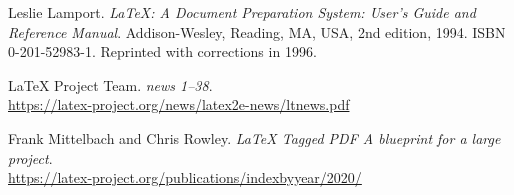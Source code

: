 \documentclass{ltnews}
\providecommand\Dash {\unskip \textemdash}
\begin{document}
\begin{thebibliography}{9}



Leslie Lamport.
\newblock \emph{{\LaTeX}: {A} Document Preparation System: User's Guide and Reference
  Manual}.
\newblock \mbox{Addison}-Wesley, Reading, MA, USA, 2nd edition, 1994.
\newblock ISBN 0-201-52983-1.
\newblock Reprinted with corrections in 1996.


 \LaTeX{} Project Team.
  \emph{\LaTeXe{} news 1--38}.\\
  \url{https://latex-project.org/news/latex2e-news/ltnews.pdf}

 Frank Mittelbach and Chris Rowley.
  \emph{\LaTeX{} Tagged PDF \Dash A blueprint for a large project}.\\
  \url{https://latex-project.org/publications/indexbyyear/2020/}



\end{thebibliography}
\end{document}
